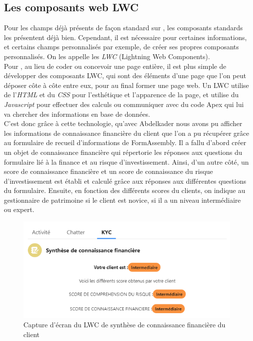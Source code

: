 \documentclass[12pt,oneside,noprintercorrection]{iut}
\begin{document}
\subsection{Les composants web LWC}
 Pour les champs déjà présents de façon standard sur \slf{}, les composants standards les présentent déjà bien. Cependant, il est nécessaire pour certaines informations, et certains champs personnalisés par exemple, de créer ses propres composants personnalisés. On les appelle les \textit{LWC} (Lightning Web Components).
 ~\\\indent Pour \slf{}, au lieu de coder ou concevoir une page entière, il est plus simple de développer des composants LWC, qui sont des éléments d'une page que l'on peut déposer côte à côte entre eux, pour au final former une page web. Un LWC utilise de l'\textit{HTML} et du \textit{CSS} pour l'esthétique et l'apparence de la page, et utilise du \textit{Javascript} pour effectuer des calculs ou communiquer avec du code Apex qui lui va chercher des informations en base de données.
 ~\\\indent C'est donc grâce à cette technologie, qu'avec Abdelkader nous avons pu afficher les informations de connaissance financière du client que l'on a pu récupérer grâce au formulaire de recueil d'informations de FormAssembly. Il a fallu d'abord créer un objet de connaissance financière qui répertorie les réponses aux questions du formulaire lié à la finance et au risque d'investissement. Ainsi, d'un autre côté, un score de connaissance financière et un score de connaissance du risque d'investissement est établi et calculé grâce aux réponses aux différentes questions du formulaire. Ensuite, en fonction des différents scores du clients, on indique au gestionnaire de patrimoine si le client est novice, si il a un niveau intermédiaire ou expert.

\begin{figure}[!ht]
  \centering
  \includegraphics[width=15cm]{img/SyntheseFinanciere.png}
  \caption{Capture d'écran du LWC de synthèse de connaissance financière du client}
\end{figure}
\end{document}
